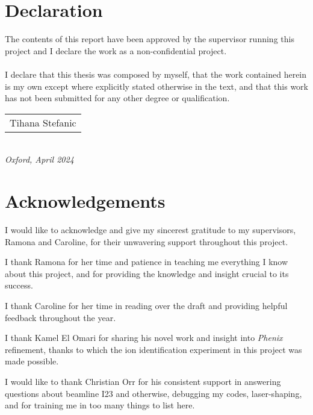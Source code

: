 %

\newpage
\setcounter{page}{1}
\section*{Declaration}
The contents of this report have been approved by the supervisor running this project and I declare the work as a non-confidential project.\\\\
I declare that this thesis was composed by myself, that the work contained herein is my own except where explicitly stated otherwise in the text, and that this work has not been submitted for any other degree or qualification. \\
\bigskip


\begin{flushright}
	\begin{tabular}{m{5cm}}
		\\ \hline
		\centering Tihana Stefanic \\
		
	\end{tabular}\\
	
	\raggedleft\textit{Oxford, April 2024}
\end{flushright}
\newpage

\section*{Acknowledgements}

I would like to acknowledge and give my sincerest gratitude to my supervisors, Ramona and Caroline, for their unwavering support throughout this project.

I thank Ramona for her time and patience in teaching me everything I know about this project, and for providing the knowledge and insight crucial to its success.

I thank Caroline for her time in reading over the draft and providing helpful feedback throughout the year.

I thank Kamel El Omari for sharing his novel work and insight into \textit{Phenix} refinement, thanks to which the ion identification experiment in this project was made possible.

I would like to thank Christian Orr for his consistent support in answering questions about beamline I23 and otherwise, debugging my codes, laser-shaping, and for training me in too many things to list here. %

